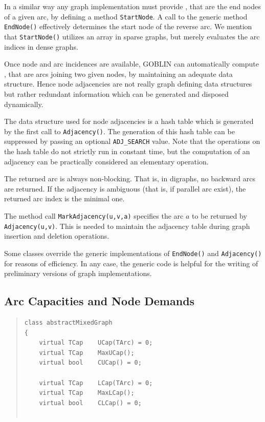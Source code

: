 \documentclass[a4paper,11pt,twoside]{book}
\begin{document}
\begin{multicols}{2}
In a similar way any graph implementation must provide ,
that are the end nodes of a given arc, by defining a method \verb/StartNode/.
A call to the generic method \verb/EndNode()/ effectively determines the start
node of the reverse arc. We mention that \verb/StartNode()/ utilizes an array
in sparse graphs, but merely evaluates the arc indices in dense graphs.

Once node and arc incidences are available, GOBLIN can automatically compute
, that are arcs joining two given nodes, by maintaining
an adequate data structure. Hence node adjacencies are not really graph
defining data structures but rather redundant information which can be
generated and disposed dynamically.

The data structure used for node adjacencies is a hash table which is generated
by the first call to \verb/Adjacency()/. The generation of this hash table can
be suppressed by passing an optional \verb/ADJ_SEARCH/ value. Note that the
operations on the hash table do not strictly run in constant time, but the
computation of an adjacency can be practically considered an elementary operation.

The returned arc is always non-blocking. That is, in digraphs, no backward arcs
are returned. If the adjacency is ambiguous (that is, if parallel arc exist),
the returned arc index is the minimal one.

The method call \verb/MarkAdjacency(u,v,a)/ specifies the arc $a$ to be returned
by \verb/Adjacency(u,v)/. This is needed to maintain the adjacency table during
graph insertion and deletion operations.

Some classes override the generic implementations of \verb/EndNode()/
and \verb/Adjacency()/ for reasons of efficiency. In any case, the generic code is
helpful for the writing of preliminary versions of graph implementations.


\subsection{Arc Capacities and Node Demands}
\methods
\begin{quote}
\begin{verbatim}
class abstractMixedGraph
{
    virtual TCap    UCap(TArc) = 0;
    virtual TCap    MaxUCap();
    virtual bool    CUCap() = 0;

    virtual TCap    LCap(TArc) = 0;
    virtual TCap    MaxLCap();
    virtual bool    CLCap() = 0;


\end{verbatim}
\end{quote}
\end{multicols}
\end{document}
